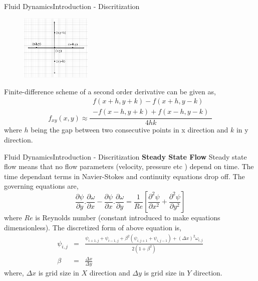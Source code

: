 \documentclass[11pt]{beamer}
\begin{document}
\begin{frame}{Fluid Dynamics}{Introduction - Discritization}
\begin{figure}[hH]
\includegraphics[width=0.3\textwidth]{images/1}
\end{figure}
Finite-difference scheme of a second order derivative can be given as,
\begin{equation}
f_{xy}(x,y) \approx \frac{ \begin{split} f(x+h,y+k) - f(x+h,y-k) \\
- f(x-h,y+k) + f(x-h,y-k) \end{split} }{4hk}
\end{equation}
where $h$ being the gap between two consecutive points in x direction and $k$ in y direction.
\end{frame}

\begin{frame}{Fluid Dynamics}{Introduction - Discritization}
\textbf{Steady State Flow}
\linebreak
Steady state flow means that no flow parameters (velocity, pressure etc ) depend on time. The time dependant terms in Navier-Stokes and continuity equations drop off. The governing equations are,
\begin{equation} \label{eqn25}
\frac{\partial \psi}{\partial y}.\frac{\partial \omega}{\partial x} - \frac{\partial \psi}{\partial x}.\frac{\partial \omega}{\partial y} = \frac{1}{Re}\left[\frac{\partial ^{2}\psi}{\partial x^{2}} + \frac{\partial ^{2}\psi}{\partial y^{2}}\right]
\end{equation}
where $Re$ is Reynolds number (constant introduced to make equations dimensionless). The discretized form of above equation is,
\begin{eqnarray} \label{spsi} 
\psi_{i,j} &=& \frac{\psi_{i+1,j} + \psi_{i-1,j} + \beta^{2}(\psi_{i,j+1} + \psi_{i,j-1}) + (\Delta x)^{2}\omega_{i,j}}{2(1+\beta^{2})} \\
\beta &=& \frac{\Delta x }{\Delta y} \nonumber
\end{eqnarray}
where, $\Delta x$ is grid size in $X$ direction and $\Delta y$ is grid size in $Y$ direction.
\end{frame}
\end{document}
